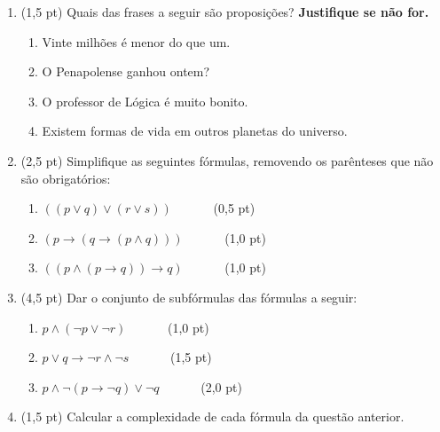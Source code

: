 \documentclass[12pt,a4paper,oneside]{article}
\begin{document}
\begin{enumerate}

	\item (1,5 pt) Quais das frases a seguir são proposições? {\bf Justifique se não for.}

		\begin{enumerate}
			\item Vinte milhões é menor do que um.
			\item O Penapolense ganhou ontem?
			\item O professor de Lógica é muito bonito.
			\item Existem formas de vida em outros planetas do universo.
		\end{enumerate}
		
	\item (2,5 pt) Simplifique as seguintes fórmulas, removendo os parênteses que não são obrigatórios:

		\begin{enumerate}
			\item $((p \vee q) \vee (r \vee s))$ \ \ \ \ \ \ (0,5 pt)
			\item $(p \rightarrow (q \rightarrow (p \wedge q)))$ \ \ \ \ \ \ (1,0 pt)
			\item $((p \wedge (p \rightarrow q)) \rightarrow q)$ \ \ \ \ \ \ (1,0 pt)
		\end{enumerate}

	\item (4,5 pt) Dar o conjunto de subfórmulas das fórmulas a seguir:
	
		\begin{enumerate}
			\item $p \wedge (\neg p \vee \neg r)$  \ \ \ \ \ \ (1,0 pt)
			\item $p \vee q \rightarrow \neg r \wedge \neg s$  \ \ \ \ \ \ (1,5 pt)
			\item $p \wedge \neg (p \rightarrow \neg q) \vee \neg q$  \ \ \ \ \ \ (2,0 pt)
		\end{enumerate}	
		
	\item (1,5 pt) Calcular a complexidade de cada fórmula da questão anterior.
	
\end{enumerate}
\end{document}
